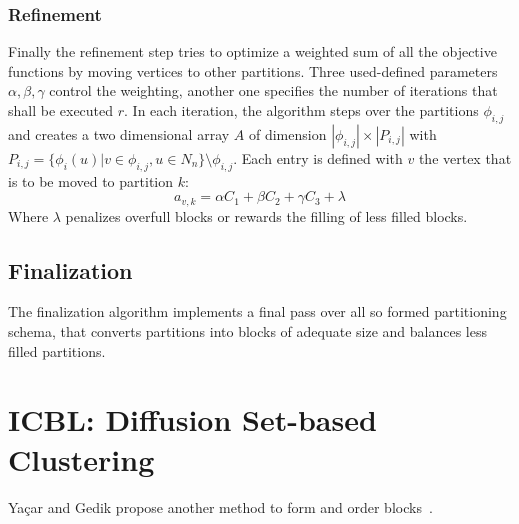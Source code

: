         \subsubsection*{Refinement}
        Finally the refinement step tries to optimize a weighted sum of all the objective functions by moving vertices to other partitions.
        Three used-defined parameters $\alpha, \beta, \gamma$ control the weighting, another one specifies the number of iterations that shall be executed $r$.
        In each iteration, the algorithm steps over the partitions $\phi_{i,j}$ and creates a two dimensional array $A$ of dimension $|\phi_{i,j}| \times |P_{i,j}|$ with $P_{i,j} = \{ \phi_i(u) | v \in \phi_{i,j}, u \in N_n\} \setminus \phi_{i,j}$.
        Each entry is defined with $v$ the vertex that is to be moved to partition $k$:
        \[ a_{v,k} = \alpha C_1 + \beta C_2 + \gamma C_3 + \lambda \]
        Where $\lambda$ penalizes overfull blocks or rewards the filling of less filled blocks.
                
    \subsection{Finalization}
    The finalization algorithm implements a final pass over all so formed partitioning schema, that converts partitions into blocks of adequate size and balances less filled partitions.
    
\section{ICBL: Diffusion Set-based Clustering}\label{\positionnumber}
    Ya\c{c}ar and Gedik propose another method to form and order blocks~\autocite{yacsar2015scalable, yacsar2017distributed}. 
        
